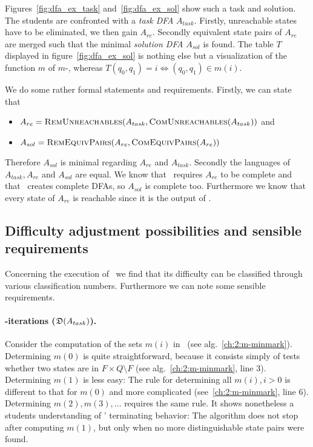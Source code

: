 \noindent Figures~\ref{fig:dfa_ex_task} and~\ref{fig:dfa_ex_sol} show such a task and solution. The students are confronted with a \emph{task DFA} $A_{task}$. Firstly, unreachable states have to be eliminated, we then gain $A_{re}$. Secondly equivalent state pairs of $A_{re}$ are merged such that the minimal \emph{solution DFA} $A_{sol}$ is found. The table $T$ displayed in figure~\ref{fig:dfa_ex_sol} is nothing else but a visualization of the function $m$ of $m$-\CompDist, whereas $T(q_0, q_1) = i \Leftrightarrow (q_0, q_1) \in m(i)$.

We do some rather formal statements and requirements. Firstly, we can state that
\begin{itemize}
	\item $A_{re} = \textsc{RemUnreachables}(A_{task}, \textsc{ComUnreachables}(A_{task}))$ and
	\item $A_{sol} = \textsc{RemEquivPairs}(A_{re}, \textsc{ComEquivPairs}(A_{re}))$
\end{itemize}
Therefore $A_{sol}$ is minimal regarding $A_{re}$ and $A_{task}$. Secondly the languages of $A_{task}, A_{re}$ and $A_{sol}$ are equal. We know that \CompDist\ requires $A_{re}$ to be complete and that \RemEq\ creates complete DFAs, so $A_{sol}$ is complete too. Furthermore we know that every state of $A_{re}$ is reachable since it is the output of \RemUnr.

\subsection{Difficulty adjustment possibilities and sensible requirements}\label{ch:2:requirements-analysis}

Concerning the execution of \MinAlg\ we find that its difficulty can be classified through various classification numbers. Furthermore we can note some sensible requirements.

\paragraph*{\CompDist-iterations ($\mathfrak{D}(A_{task})$).}

Consider the computation of the sets $m(i)$ in \CompDist\ (see alg.~\ref{ch:2:m-minmark}). Determining $m(0)$ is quite straightforward, because it consists simply of tests whether two states are in $F \times Q \setminus F$ (see alg.~\ref{ch:2:m-minmark}, line 3). Determining $m(1)$ is less easy: The rule for determining all $m(i), i > 0$ is different to that for $m(0)$ and more complicated (see~\ref{ch:2:m-minmark}, line 6). Determining $m(2), m(3), \ldots$ requires the same rule. It shows nonetheless a students understanding of \CompDist' terminating behavior: The algorithm does not stop after computing $m(1)$, but only when no more distinguishable state pairs were found.

